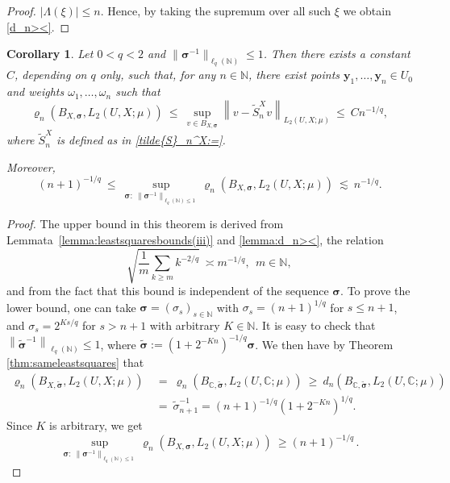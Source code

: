 \documentclass[11pt]{article}
\newtheorem{corollary}{Corollary}[section]
\numberwithin{equation}{section}
\theoremstyle{definition}
\theoremstyle{remark}
\newcommand{\norm}[2]{\left\|{#1}\right\|_{#2}}
\newcommand{\by}{{\boldsymbol{y}}}
\newcommand{\bsigma}{{\boldsymbol{\sigma}}}
\def\NN{{\mathbb N}}
\def\CC{{\mathbb C}}
\def\CC{{\mathbb C}}
\def\NN{{\mathbb N}}
\def\CC{{\mathbb C}}
\def\NN{{\mathbb N}}
\begin{document}
{\begin{proof}
$|\Lambda(\xi)|\le n$.  Hence, by taking the supremum over all such $\xi$ we obtain \eqref{d_n><}.
	\hfill
\end{proof}
\begin{corollary} \label{corollary:varrho_n(iii)}
Let $0 < q < 2$ and $\|\bsigma^{-1}\|_{\ell_q(\NN)} \le 1$.	
    Then there exists a constant $C$, depending on $q$ only, such that, for any $n \in \NN$, there exist points 
		$\by_1, \dots, \by_n \in U_0$ and weights  $\omega_1, \dots, \omega_n$ such that 
	\begin{equation}\nonumber
		\varrho_n(B_{X,\bsigma}, L_2(U,X;\mu)) 
		\ \le \ 
	\sup_{v\in B_{X,\bsigma}} \norm{v - \tilde{S}_{{n}}^X v}{L_2(U,X;\mu)}
		\ \le \ C n^{-1/q},
	\end{equation}
		where  
	$\tilde{S}_n^X$ is defined as in \eqref{tilde{S}_n^X:=}.
	
	Moreover,
		\begin{equation}\nonumber
			(n+1)^{-1/q} 
			\ \le \
			\sup_{\bsigma: \ \|\bsigma^{-1}\|_{\ell_q(\NN) \le 1}}	\varrho_n(B_{X,\bsigma}, L_2(U,X;\mu)) 
            \ \lesssim\ n^{-1/q}.
		\end{equation}
\end{corollary}	


 \begin{proof}	
     The upper bound in this theorem is derived from {Lemmata~\ref{lemma:leastsquaresbounds(iii)} and \ref{lemma:d_n><}}, the relation
 	\begin{equation*} \label{rho_n<}
 		\sqrt{\frac{1}{m} \sum_{k \ge m} k^{-2/q}}
 	\ \asymp 	m^{-1/q}, \ \ m \in \NN,
 \end{equation*}	
 and from the fact that this bound is independent of the sequence $\bsigma$.
 To prove the lower bound, one can take $\bsigma=(\sigma_s)_{s \in \NN}$ with 
 $\sigma_s =  (n+1)^{1/q}$ for $s \le n+1$, and 
 $\sigma_s = 2^{Ks/q} $ for $s > n+1$ with arbitrary $K \in \NN$. It is easy to check that  
 $\norm{\tilde{\bsigma}^{-1}}{\ell_q(\NN)} \le 1$, where 
 $\tilde{\bsigma}:= (1+2^{-Kn})^{-1/q}\bsigma$.
 We then have by Theorem \ref{thm:sameleastsquares} that
 \begin{align*}
 	\varrho_n(B_{X,\tilde{\bsigma}}, L_2(U,X;\mu))
 	\ &= \ 
 	\varrho_n(B_{\CC,\tilde{\bsigma}}, L_2(U,\CC;\mu)) 
    \ \ge \
 	d_n(B_{\CC,\tilde{\bsigma}}, L_2(U,\CC;\mu)) 
 \\
     \ &= \
 	\tilde{\sigma}_{n+1}^{-1}
 	= 
 (n+1)^{-1/q}(1+2^{-Kn})^{1/q}.
 \end{align*}
 Since $K$ is arbitrary, we get
 	\begin{equation}\nonumber
 	\sup_{\bsigma: \ \|\bsigma^{-1}\|_{\ell_q(\NN) \le 1}}	\varrho_n(B_{X,\bsigma}, L_2(U,X;\mu)) 
        \ \ge  (n+1)^{-1/q} \,.
 \end{equation}
 	\hfill
 \end{proof}
}
\end{document}
